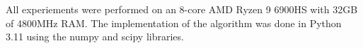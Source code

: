 All experiements were performed on an 8-core AMD Ryzen 9 6900HS with 32GB of 4800MHz RAM. The implementation of the algorithm was done in Python 3.11 using the numpy and scipy libraries. 